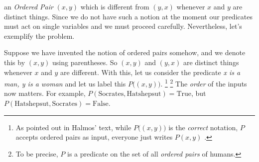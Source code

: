         an \textit{Ordered Pair} $(x,y)$ which is different
        from $(y,x)$ whenever $x$ and $y$ are distinct things. Since we do not
        have such a notion at the moment our predicates must act on single
        variables and we must proceed carefully. Nevertheless, let's exemplify
        the problem.
        \begin{example}
            Suppose we have invented the notion of ordered pairs somehow, and
            we denote this by $(x,y)$ using parentheses. So $(x,y)$ and $(y,x)$
            are distinct things whenever $x$ and $y$ are different. With this,
            let us consider the predicate \textit{x is a man, y is a woman} and
            let us label this $P\big((x,y)\big)$.%
            \footnote{%
                As pointed out in Halmos' text, while $P\big((x,y)\big)$ is the
                \textit{correct} notation, $P$ accepts ordered pairs as input,
                everyone just writes $P(x,y)$ \cite[p.~32]{Halmos1974}.
            }
            \footnote{%
                To be precise, $P$ is a predicate on the set of all
                \textit{ordered pairs} of humans.
            }
            The \textit{order} of the inputs now
            matters. For example,
            $P(\text{Socrates},\text{Hatshepsut})=\text{True}$, but
            $P(\text{Hatshepsut},\text{Socrates})=\text{False}$.
        \end{example}
